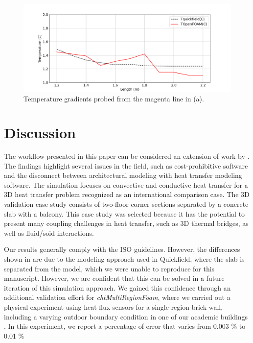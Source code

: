 \documentclass[runningheads]{llncs}
\begin{document}
\begin{figure}[tbh] 
\centering
\includegraphics[trim= 2cm 0.2cm 1cm 1.5cm, clip= true, width=1\columnwidth]{Figures/valpl2.png}
\hspace{0.3cm}
\caption{Temperature gradients probed from the magenta line in   (a).}
\label{fig:validation-plots}
\end{figure}





\section{Discussion}

The workflow presented in this paper can be considered an extension of work by \citeauthor{kastner2020solving} \cite{kastner2020solving}. The findings highlight several issues in the field, such as cost-prohibitive software and the disconnect between architectural modeling with heat transfer modeling software. 
The simulation focuses on convective and conductive heat transfer for a 3D heat transfer problem recognized as an international comparison case. The 3D validation case study consists of two-floor corner sections separated by a concrete slab with a balcony. This case study was selected because it has the potential to present many coupling challenges in heat transfer, such as 3D thermal bridges, as well as fluid/soid interactions.

Our results generally comply with the ISO guidelines. However, the differences shown in  are due to the modeling approach used in Quickfield, where the slab is separated from the model, which we were unable to reproduce for this manuscript.
However, we are confident that this can be solved in a future iteration of this simulation approach. 
We gained this confidence through an additional validation effort for \textit{chtMultiRegionFoam}, where we carried out a physical experiment using heat flux sensors for a single-region brick wall, including a varying outdoor boundary condition in one of our academic buildings \cite{almaian2024heat}. In this experiment, we report a percentage of error that varies from 0.003 \% to 0.01 \% 
\end{document}
